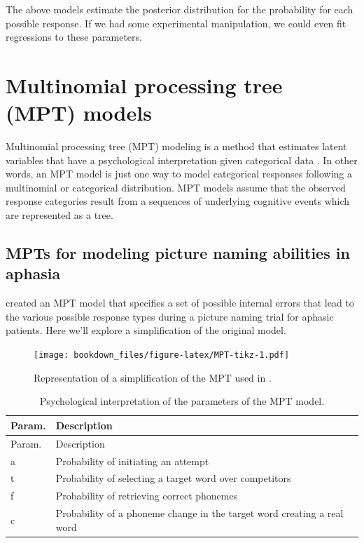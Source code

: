 \documentclass[12pt,]{krantz}
\theoremstyle{definition}
\theoremstyle{definition}
\theoremstyle{definition}
\theoremstyle{remark}
\begin{document}
The above models estimate the posterior distribution for the probability for each possible response. If we had some experimental manipulation, we could even fit regressions to these parameters.

\hypertarget{multinomial-processing-tree-mpt-models}{%
\section{Multinomial processing tree (MPT) models}\label{multinomial-processing-tree-mpt-models}}

Multinomial processing tree (MPT) modeling is a method that estimates latent variables that have a psychological interpretation given categorical data \citep[a review is provided in][]{BatchelderRiefer1999}. In other words, an MPT model is just one way to model categorical responses following a multinomial or categorical distribution. MPT models assume that the observed response categories result from a sequences of underlying cognitive events which are represented as a tree.

\hypertarget{mpts-for-modeling-picture-naming-abilities-in-aphasia}{%
\subsection{MPTs for modeling picture naming abilities in aphasia}\label{mpts-for-modeling-picture-naming-abilities-in-aphasia}}

\citet{WalkerEtAl2018} created an MPT model that specifies a set of possible internal errors that lead to the various possible response types during a picture naming trial for aphasic patients. Here we'll explore a simplification of the original model.



\begin{figure}
\centering
\texttt{[image: bookdown\_files/figure-latex/MPT-tikz-1.pdf]}
\caption{\label{fig:MPT-tikz}Representation of a simplification of the MPT used in \citet{WalkerEtAl2018}.}
\end{figure}

\begin{longtable}[]{@{}ll@{}}
\caption{\label{tab:MPT-params} Psychological interpretation of the parameters of the MPT model.}\tabularnewline
\toprule
Param. & Description\tabularnewline
\midrule
\endfirsthead
\toprule
Param. & Description\tabularnewline
\midrule
\endhead
a & Probability of initiating an attempt\tabularnewline
t & Probability of selecting a target word over competitors\tabularnewline
f & Probability of retrieving correct phonemes\tabularnewline
c & Probability of a phoneme change in the target word creating a real word\tabularnewline
\bottomrule
\end{longtable}
\end{document}
